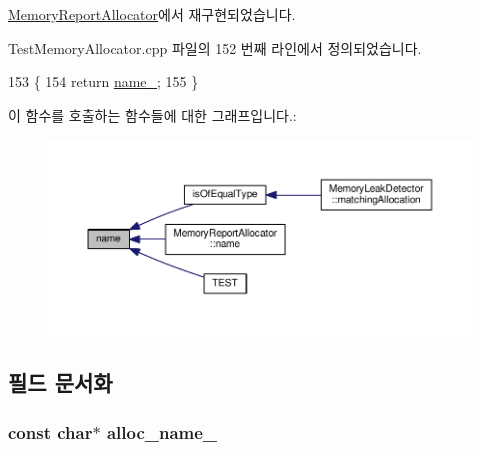 \hyperlink{class_memory_report_allocator_a90b3e100eca6e28565e6447326b1f7b0}{Memory\+Report\+Allocator}에서 재구현되었습니다.



Test\+Memory\+Allocator.\+cpp 파일의 152 번째 라인에서 정의되었습니다.


\begin{DoxyCode}
153 \{
154     \textcolor{keywordflow}{return} \hyperlink{class_test_memory_allocator_a7dac8366c11fbcad2f49d85fe8fc4fbe}{name\_};
155 \}
\end{DoxyCode}


이 함수를 호출하는 함수들에 대한 그래프입니다.\+:
\nopagebreak
\begin{figure}[H]
\begin{center}
\leavevmode
\includegraphics[width=350pt]{class_test_memory_allocator_a6a96605bec5749750a0b4be6e2d6e721_icgraph}
\end{center}
\end{figure}




\subsection{필드 문서화}
\subsubsection[{\texorpdfstring{alloc\+\_\+name\+\_\+}{alloc_name_}}]{\setlength{\rightskip}{0pt plus 5cm}const char$\ast$ alloc\+\_\+name\+\_\+\hspace{0.3cm}{\ttfamily [protected]}}\hypertarget{class_test_memory_allocator_ae5a98ff3b709da10db95a0ed03362548}{}\label{class_test_memory_allocator_ae5a98ff3b709da10db95a0ed03362548}


